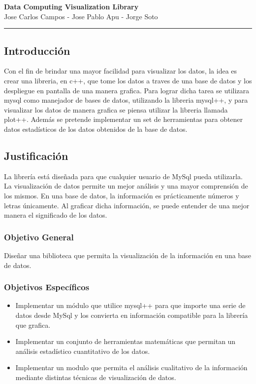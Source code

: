\documentclass[11pt]{article}
\begin{document}
\begin{center}
{ \huge \bfseries Data Computing Visualization Library }\\[0.2cm]
{ Jose Carlos Campos - Jose Pablo Apu - Jorge Soto }\\[0.2cm]
\rule{\linewidth}{0.25mm}
\end{center}

\subsection*{Introducción}
Con el fin de brindar una mayor facilidad para visualizar los datos, la idea es crear una libreria, en c++, 
que tome los datos a traves de una base de datos y los despliegue en pantalla de una manera grafica. 
Para lograr dicha tarea se utilizara mysql como manejador de bases de datos, utilizando la libreria mysql++, 
y para visualizar los datos de manera grafica se piensa utilizar la libreria llamada plot++. 
Además se pretende implementar un set de herramientas para obtener datos estadísticos de los datos obtenidos de la base de datos. 

\subsection*{Justificación}
La librería está diseñada para que cualquier usuario de MySql pueda utilizarla. La visualización de datos 
permite un mejor análisis y una mayor comprensión de los mismos. En una base de datos, la información es 
prácticamente números y letras únicamente. Al graficar dicha información, se puede entender de una mejor
manera el significado de los datos.

\subsubsection*{Objetivo General}
Diseñar una biblioteca que permita la visualización de la información en una base de datos.

\subsubsection*{Objetivos Específicos}
\begin{itemize}
\item Implementar un módulo que utilice mysql++ para que importe una serie de datos desde MySql 
      y los convierta en información compatible para la librería que grafica.
\item Implementar un conjunto de herramientas matemáticas que permitan un análisis estadístico cuantitativo de los datos.
\item Implementar un modulo que permita el análisis cualitativo de la información mediante distintas técnicas de visualización de datos.
\end{itemize}
\end{document}
